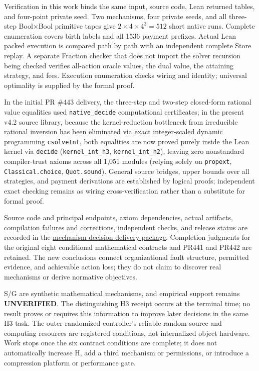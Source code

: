 \documentclass[
  english,
  11pt,
  oneside]{book}
\begin{document}
Verification in this work binds the same input, source code, Lean returned tables, and four-point private seed. Two mechanisms, four private seeds, and all three-step Bool×Bool primitive tapes give \(2\times4\times4^3=512\) short native runs. Complete enumeration covers birth labels and all 1536 payment prefixes. Actual Lean packed execution is compared path by path with an independent complete Store replay. A separate Fraction checker that does not import the solver recursion being checked verifies all-action oracle values, the dual value, the attaining strategy, and fees. Execution enumeration checks wiring and identity; universal optimality is supplied by the formal proof.

In the initial PR \#443 delivery, the three-step and two-step closed-form rational value equalities used \nolinkurl{native_decide} computational certificates; in the present v4.2 source library, because the kernel-reduction bottleneck from irreducible rational inversion has been eliminated via exact integer-scaled dynamic programming \texttt{csolveInt}, both equalities are now proved purely inside the Lean kernel via \texttt{decide} (\nolinkurl{kernel_int_h3}, \nolinkurl{kernel_int_h2}), leaving zero nonstandard compiler-trust axioms across all 1,051 modules (relying solely on \texttt{propext}, \nolinkurl{Classical.choice}, \texttt{Quot.sound}). General source bridges, upper bounds over all strategies, and payment derivations are established by logical proofs; independent exact checking remains as wiring cross-verification rather than a substitute for formal proof.

Source code and principal endpoints, axiom dependencies, actual artifacts, compilation failures and corrections, independent checks, and release status are recorded in the \href{../formalization/ueot-core/docs/compression/theory_completion/unified_closure/mechanism_decision_closure_v1/README.md}{mechanism decision delivery package}. Completion judgments for the original eight conditional mathematical contracts and PR441 and PR442 are retained. The new conclusions connect organizational fault structure, permitted evidence, and achievable action loss; they do not claim to discover real mechanisms or derive normative objectives.

S/G are synthetic mathematical mechanisms, and empirical support remains \textbf{UNVERIFIED}. The distinguishing H3 receipt occurs at the terminal time; no result proves or requires this information to improve later decisions in the same H3 task. The outer randomized controller's reliable random source and computing resources are registered conditions, not internalized object hardware. Work stops once the six contract conditions are complete; it does not automatically increase H, add a third mechanism or permissions, or introduce a compression platform or performance gate.
\end{document}
